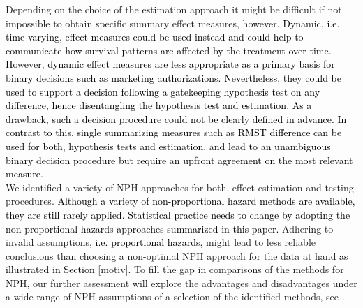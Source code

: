 \documentclass{article}
\newcommand{\NEW}[2][black]{\textcolor{#1}{#2}}
\begin{document}
Depending on the choice of the estimation approach it might be difficult if not impossible to obtain specific summary effect measures, however. \NEW{Dynamic, i.e. time-varying, effect measures could be used instead and could help to communicate how survival patterns are affected by the treatment over time.
However, dynamic effect measures are less appropriate as a primary basis for binary decisions such as marketing authorizations. Nevertheless, they could be used to support a decision following a gatekeeping hypothesis test on any difference, hence disentangling the hypothesis test and estimation. As a drawback, such a decision procedure could not be clearly defined in advance. In contrast to this, single summarizing measures such as RMST difference can be used for both, hypothesis tests and estimation, and lead to an unambiguous binary decision procedure but require an upfront agreement on the most relevant measure. }
\\
\noindent 
We identified a variety of NPH approaches for both, effect estimation and testing procedures.
\NEW{Although a variety of non-proportional hazard methods are available, they are still rarely applied. Statistical practice needs to change by adopting the non-proportional hazards approaches summarized in this paper. }
Adhering to invalid assumptions\NEW{, i.e. proportional hazards,}  might lead to less reliable conclusions than choosing a non-optimal NPH approach for the data at hand \NEW{as illustrated in Section \ref{motiv}}. To fill the gap in comparisons of the methods for NPH, our further assessment will explore the advantages and disadvantages under a wide range of NPH assumptions of a selection of the identified methods, see \cite{klinglmüller2023neutral}.
\end{document}
